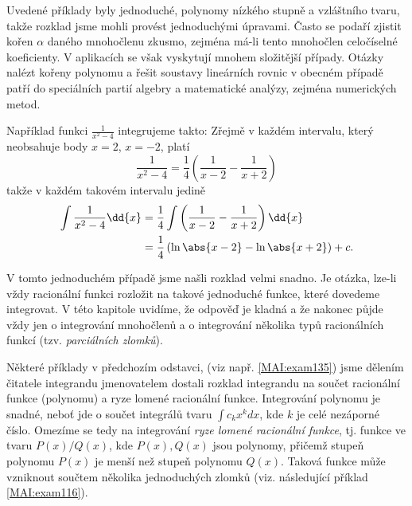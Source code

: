       Uvedené příklady byly jednoduché, polynomy nízkého stupně a vzláštního tvaru, takže rozklad
      jsme mohli provést jednoduchými úpravami. Často se podaří zjistit kořen \(\alpha\) daného
      mnohočlenu zkusmo, zejména má-li tento mnohočlen celočíselné koeficienty. V aplikacích se však
      vyskytují mnohem složitější případy. Otázky nalézt kořeny polynomu a řešit soustavy lineárních
      rovnic v obecném případě patří do speciálních partií algebry a matematické analýzy, zejména
      numerických metod.
      
      Například funkci \(\frac{1}{x^2-4}\) integrujeme takto: Zřejmě v každém intervalu, který
      neobsahuje body \(x=2\), \(x=-2\), platí
      \begin{equation*}
        \dfrac{1}{x^2-4} = \dfrac{1}{4}\left(\dfrac{1}{x-2} - \dfrac{1}{x+2}\right)
      \end{equation*}
      takže v každém takovém intervalu jedině
      \begin{align*}
        \int\dfrac{1}{x^2-4}\dd{x}  
          &= \dfrac{1}{4}\int\left(\dfrac{1}{x-2} - \dfrac{1}{x+2}\right)\dd{x}             \\
          &= \dfrac{1}{4}\left(\ln\abs{x-2} - \ln\abs{x+2}\right) + c.        
      \end{align*}

      V tomto jednoduchém případě jsme našli rozklad velmi snadno. Je otázka, lze-li vždy racionální
      funkci rozložit na takové jednoduché funkce, které dovedeme integrovat. V této kapitole
      uvidíme, že odpověď je kladná a že nakonec půjde vždy jen o integrování mnohočlenů a o
      integrování několika typů racionálních funkcí (tzv. \emph{parciálních zlomků}). 

      
      
    \newpage
      Některé příklady v předchozím odstavci, (viz např. \ref{MAI:exam135}) jsme dělením čitatele
      integrandu jmenovatelem dostali rozklad integrandu na součet racionální funkce (polynomu) a
      ryze lomené racionální funkce. Integrování polynomu je snadné, neboť jde o součet integrálů
      tvaru $\int c_kx^k dx$, kde $k$ je celé nezáporné číslo. Omezíme se tedy na integrování
      \emph{ryze lomené racionální funkce},  tj. funkce ve tvaru $P(x)/Q(x)$, kde $P(x), Q(x)$ jsou
      polynomy, přičemž stupeň polynomu $P(x)$ je menší než stupeň polynomu $Q(x)$. Taková funkce
      může vzniknout součtem několika jednoduchých zlomků (viz. následující příklad
      \ref{MAI:exam116}).
      
